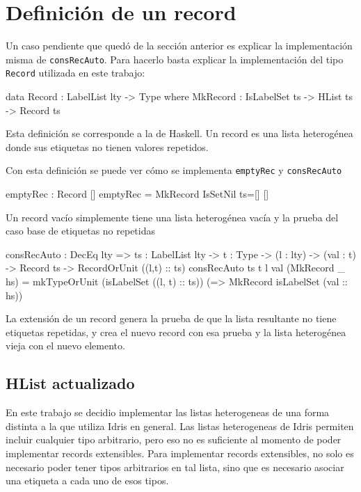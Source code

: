 \section{Definición de un record}

Un caso pendiente que quedó de la sección anterior es explicar la implementación misma de \texttt{consRecAuto}. Para hacerlo basta explicar la implementación del tipo \texttt{Record} utilizada en este trabajo:

\begin{code}
data Record : LabelList lty -> Type where
    MkRecord : IsLabelSet ts -> HList ts -> Record ts
\end{code}

Esta definición se corresponde a la de Haskell. Un record es una lista heterogénea donde sus etiquetas no tienen valores repetidos.

Con esta definición se puede ver cómo se implementa \texttt{emptyRec} y \texttt{consRecAuto}

\begin{code}
emptyRec : Record []
emptyRec = MkRecord IsSetNil {ts=[]} [] 
\end{code}

Un record vacío simplemente tiene una lista heterogénea vacía y la prueba del caso base de etiquetas no repetidas

\begin{code}
consRecAuto : DecEq lty => {ts : LabelList lty} -> 
  {t : Type} -> (l : lty) -> (val : t) -> Record ts -> 
  RecordOrUnit ((l,t) :: ts)
consRecAuto {ts} {t} l val (MkRecord _ hs) = 
  mkTypeOrUnit (isLabelSet ((l, t) :: ts)) 
  (\isLabelSet => MkRecord isLabelSet (val :: hs))
\end{code}

La extensión de un record genera la prueba de que la lista resultante no tiene etiquetas repetidas, y crea el nuevo record con esa prueba y la lista heterogénea vieja con el nuevo elemento.

\subsection{HList actualizado}

En este trabajo se decidio implementar las listas heterogeneas de una forma distinta a la que utiliza Idris en general. Las listas heterogeneas de Idris permiten incluir cualquier tipo arbitrario, pero eso no es suficiente al momento de poder implementar records extensibles. Para implementar records extensibles, no solo es necesario poder tener tipos arbitrarios en tal lista, sino que es necesario asociar una etiqueta a cada uno de esos tipos.

